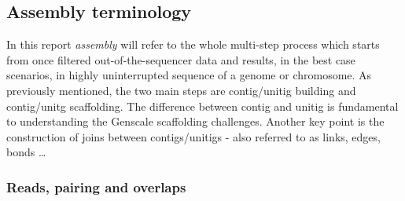 \documentclass[10pt, twocolumn]{article}
\begin{document}
\subsection{Assembly terminology}\label{sec:assterm}
In this report \textit{assembly} will refer to the whole multi-step process which starts from once filtered out-of-the-sequencer data and results, in the best case scenarios, in  highly uninterrupted sequence of a genome or chromosome. As previously mentioned, the two main steps are contig/unitig building and contig/unitg scaffolding. The difference between contig and unitig is fundamental to understanding the Genscale scaffolding challenges. Another key point is the construction of joins between contigs/unitigs - also referred to as links, edges, bonds \ldots 
\subsubsection{Reads, pairing and overlaps} \label{sec:rpao}
\end{document}
